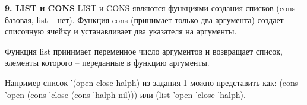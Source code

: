 \textbf{9. LIST и CONS}
LIST и CONS являются функциями создания списков (cons – базовая, list – нет).
Функция cons (принимает только два аргумента) создает списочную ячейку и устанавливает два указателя на аргументы. 

Функция list принимает переменное число аргументов и возвращает список, элементы которого – переданные в функцию аргументы.



Например список '(open close halph) из задания 1 можно представить как:
(cons 'open (cons 'close (cons 'halph nil))) 
или (list 'open 'close 'halph).




